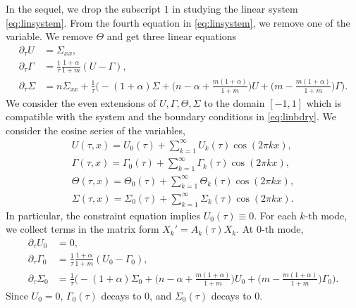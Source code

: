 \documentclass[a4paper,11pt]{article}
\theoremstyle{remark}
\begin{document}
In the sequel, we drop the subscript $1$ in studying the linear system \eqref{eq:linsystem}. From the fourth equation in \eqref{eq:linsystem}, we remove one of the variable. We remove $\Theta$ and get three linear equations
\begin{equation}
 \begin{aligned}
  \partial_\tau U &= \Sigma_{xx},\\
  \partial_\tau\Gamma &= \frac{1}{\tau}\frac{1+\alpha}{1+m}(U-\Gamma),\\
  \partial_\tau\Sigma 
  &= n\Sigma_{xx} +\frac{1}{\tau}\Big( -(1+\alpha)\Sigma + \big(n-\alpha + \frac{m(1+\alpha)}{1+m}\big)U + \big(m - \frac{m(1+\alpha)}{1+m}\big)\Gamma\Big).
 \end{aligned}
\end{equation}
We consider the even extensions of $U,\Gamma,\Theta,\Sigma$ to the domain $[-1,1]$ which is compatible with the system and the boundary conditions in \eqref{eq:linbdry}. We consider the cosine series of the variables,
\begin{align*}
 U(\tau,x) = U_0(\tau) + \sum_{k=1}^\infty U_k(\tau)\cos(2\pi kx),\\
 \Gamma(\tau,x) = \Gamma_0(\tau) + \sum_{k=1}^\infty \Gamma_k(\tau)\cos(2\pi kx),\\
 \Theta(\tau,x) = \Theta_0(\tau) + \sum_{k=1}^\infty \Theta_k(\tau)\cos(2\pi kx),\\
 \Sigma(\tau,x) = \Sigma_0(\tau) + \sum_{k=1}^\infty \Sigma_k(\tau)\cos(2\pi kx).
\end{align*}
In particular, the constraint equation implies $U_0(\tau)\equiv0$. For each $k$-th mode, we collect terms in the matrix form $X_k' = A_k(\tau)X_k$. At $0$-th mode,
\begin{align*}
   \partial_\tau U_0 &= 0,\\
  \partial_\tau\Gamma_0 &= \frac{1}{\tau}\frac{1+\alpha}{1+m}(U_0-\Gamma_0),\\
  \partial_\tau\Sigma_0 &= \frac{1}{\tau}\Big( -(1+\alpha)\Sigma_0 + \big(n-\alpha + \frac{m(1+\alpha)}{1+m}\big)U_0 + \big(m - \frac{m(1+\alpha)}{1+m}\big)\Gamma_0\Big).
\end{align*}
Since $U_0=0$, $\Gamma_0(\tau)$ decays to $0$, and $\Sigma_0(\tau)$ decays to $0$.
\end{document}
